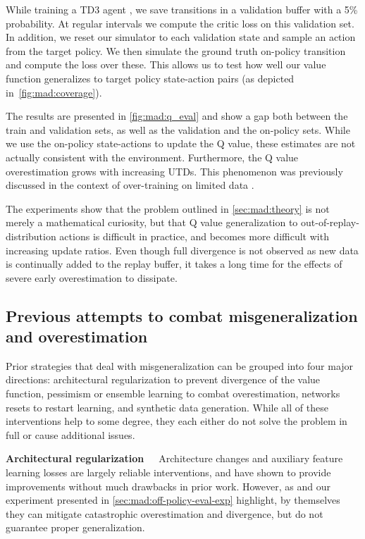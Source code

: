 While training a TD3 agent \parencite{fujimoto2018addressing}, we save transitions in a validation buffer with a 5\% probability.
At regular intervals we compute the critic loss on this validation set.
In addition, we reset our simulator to each validation state and sample an action from the target policy.
We then simulate the ground truth on-policy transition and compute the loss over these.
This allows us to test how well our value function generalizes to target policy state-action pairs (as depicted in~\autoref{fig:mad:coverage}).

The results are presented in \autoref{fig:mad:q_eval} and show a gap both between the train and validation sets, as well as the validation and the on-policy sets.
While we use the on-policy state-actions to update the Q value, these estimates are not actually consistent with the environment.
Furthermore, the Q value overestimation grows with increasing UTDs.
This phenomenon was previously discussed in the context of over-training on limited data \parencite{hussing2024dissecting} .

The experiments show that the problem outlined in \autoref{sec:mad:theory} is not merely a mathematical curiosity, but that Q value generalization to out-of-replay-distribution actions is difficult in practice, and becomes more difficult with increasing update ratios.
Even though full divergence is not observed as new data is continually added to the replay buffer, it takes a long time for the effects of severe early overestimation to dissipate.

\subsection{Previous attempts to combat misgeneralization and overestimation}
\label{sec:mad:prior}
Prior strategies that deal with misgeneralization can be grouped into four major directions: architectural regularization to prevent divergence of the value function, pessimism or ensemble learning to combat overestimation, networks resets to restart learning, and synthetic data generation.
While all of these interventions help to some degree, they each either do not solve the problem in full or cause additional issues.

\textbf{Architectural regularization}~~~Architecture changes \parencite{hussing2024dissecting,nauman2024overestimation,nauman2024bigger,lyle2024disentangling} and auxiliary feature learning losses \parencite{schwarzer2021dataefficient,zhao2023simplified,ni2024bridging,voelcker2024when} are largely reliable interventions, and have shown to provide improvements without much drawbacks in prior work.
However, as \textcite{hussing2024dissecting} and our experiment presented in \autoref{sec:mad:off-policy-eval-exp} highlight, by themselves they can mitigate catastrophic overestimation and divergence, but do not guarantee proper generalization. %

